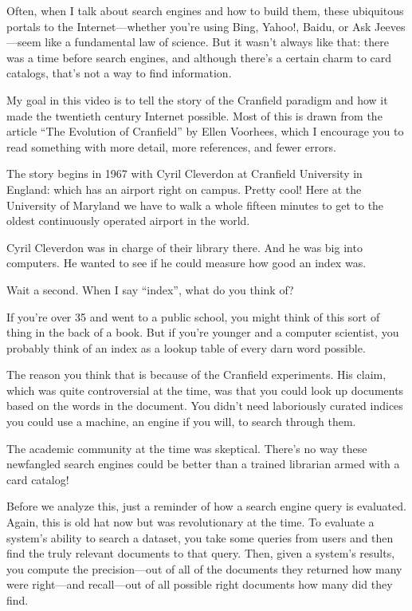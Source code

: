 





Often, when I talk about search engines and how to build them, these ubiquitous portals to the Internet—whether you’re using Bing, Yahoo!, Baidu, or Ask Jeeves—seem like a fundamental law of science.  But it wasn’t always like that: there was a time before search engines, and although there’s a certain charm to card catalogs, that’s not a way to find information.

My goal in this video is to tell the story of the Cranfield paradigm and how it made the twentieth century Internet possible.  Most of this is drawn from the article “The Evolution of Cranfield” by Ellen Voorhees, which I encourage you to read something with more detail, more references, and fewer errors.

The story begins in 1967 with Cyril Cleverdon at Cranfield University in England: which has an airport right on campus.  Pretty cool!  Here at the University of Maryland we have to walk a whole fifteen minutes to get to the oldest continuously operated airport in the world.

Cyril Cleverdon was in charge of their library there.  And he was big into computers.  He wanted to see if he could measure how good an index was.  

Wait a second.  When I say “index”, what do you think of?

If you're over 35 and went to a public school, you might think of this sort of thing in the back of a book.  But if you’re younger and a computer scientist, you probably think of an index as a lookup table of every darn word possible.

The reason you think that is because of the Cranfield experiments.  His claim, which was quite controversial at the time, was that you could look up documents based on the words in the document.  You didn’t need laboriously curated indices you could use a machine, an engine if you will, to search through them.

The academic community at the time was skeptical.  There’s no way these newfangled search engines could be better than a trained librarian armed with a card catalog!

Before we analyze this, just a reminder of how a search engine query is evaluated.  Again, this is old hat now but was revolutionary at the time.  To evaluate a system’s ability to search a dataset, you take some queries from users and then find the truly relevant documents to that query.  Then, given a system’s results, you compute the precision—out of all of the documents they returned how many were right—and recall—out of all possible right documents how many did they find.

